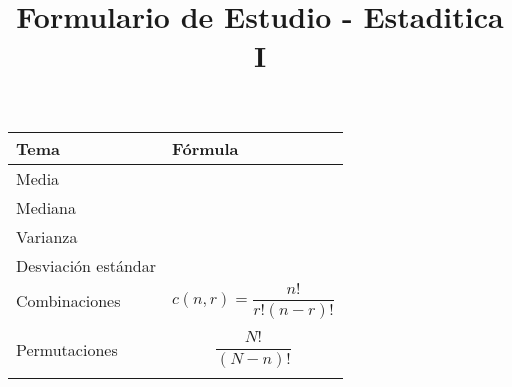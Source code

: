\documentclass{article}
\title{Formulario de Estudio - Estaditica I}
\begin{document}
\maketitle





\begin{center}
   \begin{tabular}{ | p{5cm} | p{8cm} | }
       \hline
            Tema & Fórmula    \\
       \hline
            Media & \\ 
            Mediana & \\ 
            Varianza & \\ 
            Desviación estándar & \\ 
            Combinaciones & \[
                c(n,r) = \frac{n!}{r!(n-r)!} 
            \] \\ \hline \\ 
            Permutaciones & \[
              \frac{N!}{(N-n)!} 
            \] \\ \hline \\ 
   \end{tabular}
\end{center}
\end{document}
